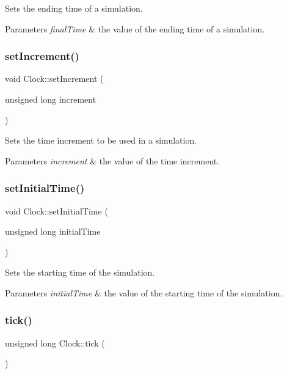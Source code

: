 Sets the ending time of a simulation. 
\begin{DoxyParams}{Parameters}
{\em final\+Time} & the value of the ending time of a simulation. \\
\hline
\end{DoxyParams}
\mbox{\label{class_clock_a1ae60dca4e41f6e27d6104ec618c02f1}} 
\subsubsection{\texorpdfstring{set\+Increment()}{setIncrement()}}
{\footnotesize\ttfamily void Clock\+::set\+Increment (\begin{DoxyParamCaption}\item[{unsigned long}]{increment }\end{DoxyParamCaption})}

Sets the time increment to be used in a simulation. 
\begin{DoxyParams}{Parameters}
{\em increment} & the value of the time increment. \\
\hline
\end{DoxyParams}
\mbox{\label{class_clock_abe7fb8f715d0dcae08e52b2b7aed7db2}} 
\subsubsection{\texorpdfstring{set\+Initial\+Time()}{setInitialTime()}}
{\footnotesize\ttfamily void Clock\+::set\+Initial\+Time (\begin{DoxyParamCaption}\item[{unsigned long}]{initial\+Time }\end{DoxyParamCaption})}

Sets the starting time of the simulation. 
\begin{DoxyParams}{Parameters}
{\em initial\+Time} & the value of the starting time of the simulation. \\
\hline
\end{DoxyParams}
\mbox{\label{class_clock_ab7c857c5b43cf98d991435ba9ce46b2c}} 
\subsubsection{\texorpdfstring{tick()}{tick()}}
{\footnotesize\ttfamily unsigned long Clock\+::tick (\begin{DoxyParamCaption}{ }\end{DoxyParamCaption})}

